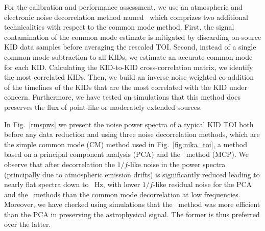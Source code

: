 {\lp For the calibration and performance assessment, we use an
atmospheric and electronic noise
decorrelation method named \cmoneb\, which comprizes two
additional technicalities with respect to the common mode
method.} First, the signal contamination of the common mode estimate
is mitigated by discarding on-source KID data samples before averaging
the rescaled TOI. Second, instead of a single common mode subtraction to
all KIDs, we estimate an accurate common mode for each
KID. Calculating the KID-to-KID cross-correlation matrix, we
identify the most correlated KIDs. Then, we build an
inverse noise weighted co-addition of the timelines of the %
KIDs that are the most correlated with the KID under
concern. Furthermore, we have tested on simulations that this method
does preserves the flux of {\lp point-like or moderately extended sources.}

In Fig.~\ref{rmspws} we present the noise power spectra of
a typical KID TOI both before any data reduction and using three noise
decorrelation methods, which are the simple common mode (CM) method
used in Fig.~\ref{fig:nika_toi}, a method based on a principal component
analysis (PCA) and the \cmoneb\ method (MCP). We observe that after decorrelation the
$1/f$-like noise in the power spectra (principally due to atmospheric
emission drifts)
is significantly reduced leading to nearly flat spectra down to {~Hz}, with
lower $1/f$-like residual noise for the PCA and the \cmoneb\ methods
than the common mode decorrelation at low frequencies. {\lp Moreover, we
have checked using simulations that the \cmoneb\ method was more
efficient than the PCA in preserving the astrophysical signal. The
former is thus preferred over the latter.} 

